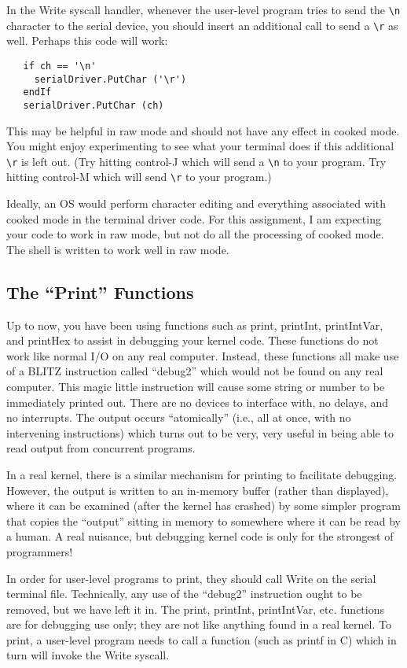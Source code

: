 \documentclass[11pt]{article}
\begin{document}
In the Write syscall handler, whenever the user-level program tries to
send the \verb+\n+ character to the serial device, you should insert an
additional call to send a \verb+\r+ as well.  Perhaps this code will work:

\begin{verbatim}
   if ch == '\n'
     serialDriver.PutChar ('\r')
   endIf
   serialDriver.PutChar (ch)
\end{verbatim}

This may be helpful in raw mode and should not have any effect in
cooked mode.  You might enjoy experimenting to see what your terminal
does if this additional \verb+\r+ is left out.  (Try hitting control-J which
will send a \verb+\n+ to your program.  Try hitting control-M which will send
\verb+\r+ to your program.)

Ideally, an OS would perform character editing and everything
associated with cooked mode in the terminal driver code.  For
this assignment, I am expecting your code to work in raw
mode, but not do all the processing of cooked mode.  The
shell is written to work well in raw mode.

\subsection{The ``Print'' Functions}

Up to now, you have been using functions such as print, printInt,
printIntVar, and printHex to assist in debugging your kernel code.
These functions do not work like normal I/O on any real computer.
Instead, these functions all make use of a BLITZ instruction called
``debug2'' which would not be found on any real computer.  This magic
little instruction will cause some string or number to be immediately
printed out.  There are no devices to interface with, no delays, and
no interrupts.  The output occurs ``atomically'' (i.e., all at once,
with no intervening instructions) which turns out to be very, very
useful in being able to read output from concurrent programs.

In a real kernel, there is a similar mechanism for printing to
facilitate debugging.  However, the output is written to an in-memory
buffer (rather than displayed), where it can be examined (after the
kernel has crashed) by some simpler program that copies the ``output''
sitting in memory to somewhere where it can be read by a human.  A
real nuisance, but debugging kernel code is only for the strongest of
programmers!

In order for user-level programs to print, they should call Write on
the serial terminal file.  Technically, any use of the ``debug2''
instruction ought to be removed, but we have left it in.  The print,
printInt, printIntVar, etc. functions are for debugging use only; they
are not like anything found in a real kernel.  To print, a user-level
program needs to call a function (such as printf in C) which in turn
will invoke the Write syscall.
\end{document}
